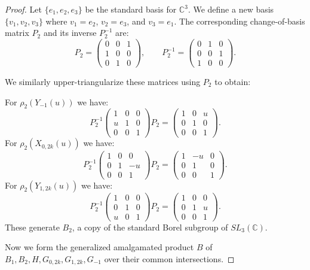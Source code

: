 \documentclass[10pt,a4paper]{amsart}
\begin{document}
{\begin{proof}
Let $\{e_1, e_2, e_3\}$ be the standard basis for $\mathbb{C}^3$. We define a new basis $\{v_1, v_2, v_3\}$ where $v_1=e_2$, $v_2=e_3$, and $v_3=e_1$. The corresponding change-of-basis matrix $P_2$ and its inverse $P_2^{-1}$ are:
\[
P_2 = \begin{pmatrix} 0 & 0 & 1 \\ 1 & 0 & 0 \\ 0 & 1 & 0 \end{pmatrix}, \qquad
P_2^{-1} = \begin{pmatrix} 0 & 1 & 0 \\ 0 & 0 & 1 \\ 1 & 0 & 0 \end{pmatrix}.
\]

We similarly upper-triangularize these matrices using $P_2$ to obtain:

For $\rho_2(Y_{-1}(u))$ we have:
\[
P_2^{-1}\begin{pmatrix}1&0&0\\ u&1&0\\ 0&0&1\end{pmatrix}P_2=\begin{pmatrix}1&0&u\\ 0&1&0\\ 0&0&1\end{pmatrix}.
\]
For $\rho_2(X_{0,2k}(u))$ we have:
\[
P_2^{-1}\begin{pmatrix}1&0&0\\ 0&1&-u\\ 0&0&1\end{pmatrix}P_2=\begin{pmatrix}1&-u&0\\ 0&1&0\\ 0&0&1\end{pmatrix}.
\]
For $\rho_2(Y_{1,2k}(u))$ we have:
\[
P_2^{-1}\begin{pmatrix}1&0&0\\ 0&1&0\\ u&0&1\end{pmatrix}P_2=\begin{pmatrix}1&0&0\\ 0&1&u\\ 0&0&1\end{pmatrix}.
\]
These generate $B_2$, a copy of the standard Borel subgroup of $SL_3(\mathbb{C})$.


\newpage


Now  we form the generalized amalgamated product $B$ of $B_1,B_2, H, G_{0,2k}, G_{1,2k}, G_{-1}$ over their common intersections.









\end{proof}}
\end{document}
